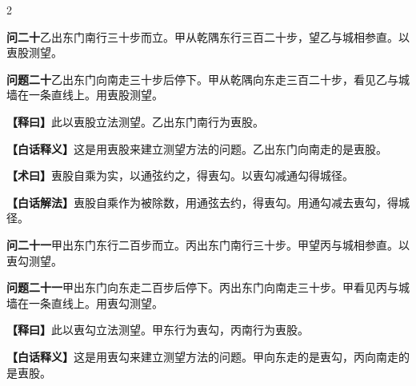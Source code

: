 \documentclass[11pt,a4paper]{article}
\newcommand{\WenQuestion}[1]{\textbf{\textcolor{classicalcolor}{#1}}}
\newcommand{\BaiQuestion}[1]{\textbf{\textcolor{moderncolor}{#1}}}
\newcommand{\WenExplain}{\textcolor{classicalcolor}{\textbf{【释曰】}}}
\newcommand{\BaiExplain}{\textcolor{moderncolor}{\textbf{【白话释义】}}}
\newcommand{\WenMethod}{\textcolor{classicalcolor}{\textbf{【术曰】}}}
\newcommand{\BaiMethod}{\textcolor{moderncolor}{\textbf{【白话解法】}}}
\begin{document}
\begin{paracol}{2}

\switchcolumn*
\begin{tcolorbox}[colback=red!3,colframe=red!30!black,boxrule=0.3pt]
\WenQuestion{问二十}\quad 乙出东门南行三十步而立。甲从乾隅东行三百二十步，望乙与城相参直。以叀股测望。
\end{tcolorbox}
\switchcolumn
\begin{tcolorbox}[colback=blue!3,colframe=blue!30!black,boxrule=0.3pt]
\BaiQuestion{问题二十}\quad 乙出东门向南走三十步后停下。甲从乾隅向东走三百二十步，看见乙与城墙在一条直线上。用叀股测望。
\end{tcolorbox}

\switchcolumn*
\begin{tcolorbox}[colback=red!5,colframe=red!30!black,boxrule=0.3pt]
\WenExplain\quad 此以叀股立法测望。乙出东门南行为叀股。
\end{tcolorbox}
\switchcolumn
\begin{tcolorbox}[colback=blue!5,colframe=blue!30!black,boxrule=0.3pt]
\BaiExplain\quad 这是用叀股来建立测望方法的问题。乙出东门向南走的是叀股。
\end{tcolorbox}

\switchcolumn*
\begin{tcolorbox}[colback=red!5,colframe=red!40!black,boxrule=0.3pt]
\WenMethod\quad 叀股自乘为实，以通弦约之，得叀勾。以叀勾减通勾得城径。
\end{tcolorbox}
\switchcolumn
\begin{tcolorbox}[colback=blue!5,colframe=blue!40!black,boxrule=0.3pt]
\BaiMethod\quad 叀股自乘作为被除数，用通弦去约，得叀勾。用通勾减去叀勾，得城径。
\end{tcolorbox}

\vspace{0.8em}

\switchcolumn*
\begin{tcolorbox}[colback=red!3,colframe=red!30!black,boxrule=0.3pt]
\WenQuestion{问二十一}\quad 甲出东门东行二百步而立。丙出东门南行三十步。甲望丙与城相参直。以叀勾测望。
\end{tcolorbox}
\switchcolumn
\begin{tcolorbox}[colback=blue!3,colframe=blue!30!black,boxrule=0.3pt]
\BaiQuestion{问题二十一}\quad 甲出东门向东走二百步后停下。丙出东门向南走三十步。甲看见丙与城墙在一条直线上。用叀勾测望。
\end{tcolorbox}

\switchcolumn*
\begin{tcolorbox}[colback=red!5,colframe=red!30!black,boxrule=0.3pt]
\WenExplain\quad 此以叀勾立法测望。甲东行为叀勾，丙南行为叀股。
\end{tcolorbox}
\switchcolumn
\begin{tcolorbox}[colback=blue!5,colframe=blue!30!black,boxrule=0.3pt]
\BaiExplain\quad 这是用叀勾来建立测望方法的问题。甲向东走的是叀勾，丙向南走的是叀股。
\end{tcolorbox}


\end{paracol}
\end{document}
